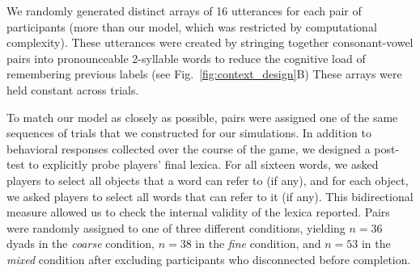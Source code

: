 We randomly generated distinct arrays of 16 utterances for each pair of participants (more than our model, which was restricted by computational complexity).
These utterances were created by stringing together consonant-vowel pairs into pronounceable 2-syllable words to reduce the cognitive load of remembering previous labels (see Fig.\ \ref{fig:context_design}B)
These arrays were held constant across trials.

To match our model as closely as possible, pairs were assigned one of the same sequences of trials that we constructed for our simulations. 
In addition to behavioral responses collected over the course of the game, we designed a post-test to explicitly probe players' final lexica. For all sixteen words, we asked players to select all objects that a word can refer to (if any), and for each object, we asked players to select all words that can refer to it (if any). 
This bidirectional measure allowed us to check the internal validity of the lexica reported.
Pairs were randomly assigned to one of three different conditions, yielding $n=36$ dyads in the \emph{coarse} condition, $n=38$ in the \emph{fine} condition, and $n=53$ in the \emph{mixed} condition after excluding participants who disconnected before completion.

